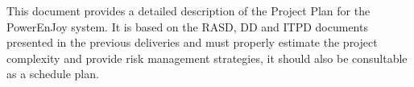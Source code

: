 This document provides a detailed description of the Project Plan for the PowerEnJoy system. It is based on the RASD, DD and ITPD documents presented in the previous deliveries and must properly estimate the project complexity and provide risk management strategies, it should also be consultable as a schedule plan.
